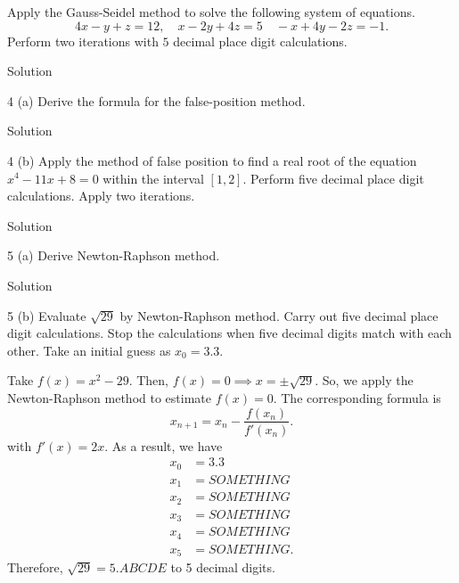 \documentclass[11pt]{penrose}
\begin{document}
\begin{problem}{3}
    Apply the Gauss-Seidel method to solve the following system of equations.
    \begin{equation*}
        4x - y + z = 12,
        \quad
        x - 2y + 4z = 5
        \quad
        -x + 4y - 2z = -1.
    \end{equation*}
    Perform two iterations with $5$ decimal place digit calculations.

    \solution Solution
\end{problem}

\begin{problem}{4 (a)}
    Derive the formula for the false-position method.

    \solution Solution
\end{problem}

\begin{problem}{4 (b)}
    Apply the method of false position to find a real root of the equation $x^4 - 11x + 8 = 0$ within the interval $[1,2]$. Perform five decimal place digit calculations. Apply two iterations.

    \solution Solution
\end{problem}

\begin{problem}{5 (a)}
    Derive Newton-Raphson method.

    \solution Solution
\end{problem}

\begin{problem}{5 (b)}
    Evaluate $\sqrt{29}$ by Newton-Raphson method. Carry out five decimal place digit calculations. Stop the calculations when five decimal digits match with each other. Take an initial guess as $x_0 = 3.3$.

    \solution Take $f(x) = x^2 - 29$. Then, $f(x) = 0 \implies x = \pm \sqrt{29}$. So, we apply the Newton-Raphson method to estimate $f(x) = 0$. The corresponding formula is
    \begin{equation*}
        x_{n+1} = x_{n} - \frac{f(x_n)}{f'(x_n)}.
    \end{equation*}
    with $f'(x) = 2x$. As a result, we have
    \begin{align*}
        x_0 &= 3.3\\
        x_1 &= SOMETHING\\
        x_2 &= SOMETHING\\
        x_3 &= SOMETHING\\
        x_4 &= SOMETHING\\
        x_5 &= SOMETHING.
    \end{align*}
    Therefore, $\sqrt{29} = 5.ABCDE$ to 5 decimal digits.
\end{problem}
\end{document}
